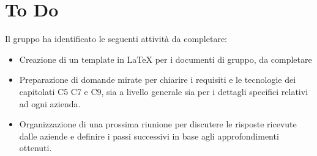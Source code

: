 \documentclass[a4paper, 12pt]{article}
\begin{document}
\section{To Do}
Il gruppo ha identificato le seguenti attività da completare:
\begin{itemize}
    \item Creazione di un template in \LaTeX{} per i documenti di gruppo, da completare
    \item Preparazione di domande mirate per chiarire i requisiti e le tecnologie dei capitolati C5 C7 e C9, sia a livello generale sia per i dettagli specifici relativi ad ogni azienda.
    \item Organizzazione di una prossima riunione per discutere le risposte ricevute dalle aziende e definire i passi successivi in base agli approfondimenti ottenuti.
\end{itemize}
\end{document}
